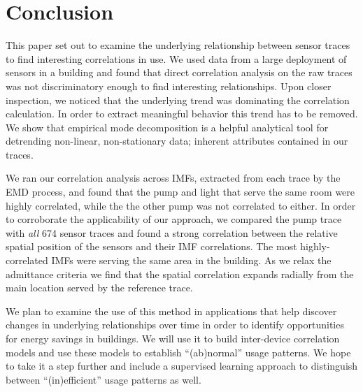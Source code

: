 



\section{Conclusion}





This paper set out to examine the underlying relationship between sensor traces to find interesting correlations
in use.  We used data from a large deployment of sensors in a building and found that direct correlation analysis on the raw
traces was not discriminatory enough to find interesting relationships.  Upon closer inspection, we noticed that
the underlying trend was dominating the correlation calculation.  In order to extract meaningful behavior this trend has
to be removed.  We show that empirical mode decomposition is a helpful analytical tool for detrending 
non-linear, non-stationary data; inherent attributes contained in our traces.


We ran our correlation analysis across IMFs, extracted from each trace by the EMD process, and found that the pump and light
that serve the same room were highly correlated, while the the other pump was not correlated to either.
In order to corroborate the applicability
of our approach, we compared the pump trace with \emph{all} 674 sensor traces and found a strong correlation
between the relative spatial position of the sensors and their IMF correlations.  The most highly-correlated IMFs were 
serving the same
area in the building.  As we relax the admittance criteria we find that the spatial correlation expands radially from
the main location served by the reference trace.

We plan to examine the use of this method in applications that help discover changes in underlying relationships over time
in order to identify opportunities for energy savings in buildings.  We will use it to build inter-device correlation models
and use these models to establish ``(ab)normal'' usage patterns.  We hope to take it a step further and include a
supervised learning approach to distinguish between ``(in)efficient'' usage patterns as well.






